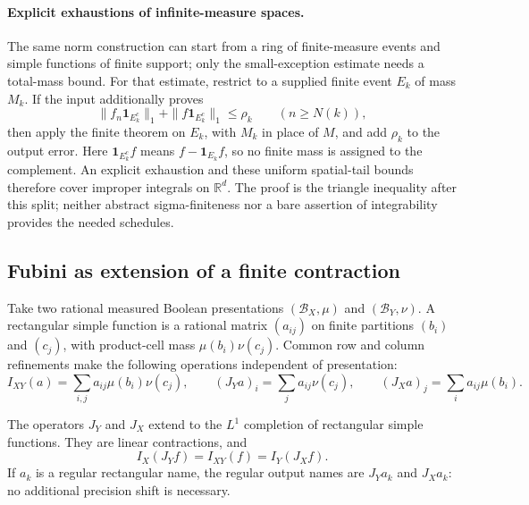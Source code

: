\paragraph{Explicit exhaustions of infinite-measure spaces.}
The same norm construction can start from a ring of finite-measure events
and simple functions of finite support; only the small-exception estimate
needs a total-mass bound.  For that estimate, restrict to a supplied finite
event \(E_k\) of mass \(M_k\).  If the input additionally proves
\[
 \|f_n\mathbf1_{E_k^c}\|_1+
 \|f\mathbf1_{E_k^c}\|_1\leq\rho_k
 \qquad(n\geq N(k)),
\]
then apply the finite theorem on \(E_k\), with \(M_k\) in place of \(M\),
and add \(\rho_k\) to the output error.  Here \(\mathbf1_{E_k^c}f\)
means \(f-\mathbf1_{E_k}f\), so no finite mass is assigned to the complement.
An explicit exhaustion and these uniform spatial-tail bounds therefore
cover improper integrals on \(\mathbb R^d\).  The proof is the triangle
inequality after this split; neither abstract sigma-finiteness nor a bare
assertion of integrability provides the needed schedules.

\subsection{Fubini as extension of a finite contraction}

Take two rational measured Boolean presentations \((\mathcal B_X,\mu)\)
and \((\mathcal B_Y,\nu)\).  A rectangular simple function is a rational
matrix \((a_{ij})\) on finite partitions \((b_i)\) and \((c_j)\), with
product-cell mass \(\mu(b_i)\nu(c_j)\).  Common row and column refinements
make the following operations independent of presentation:
\[
 I_{XY}(a)=\sum_{i,j}a_{ij}\mu(b_i)\nu(c_j),\qquad
 (J_Ya)_i=\sum_j a_{ij}\nu(c_j),\qquad
 (J_Xa)_j=\sum_i a_{ij}\mu(b_i).
\]

\begin{theorem}\label{thm:measure-fubini}
The operators \(J_Y\) and \(J_X\) extend to the \(L^1\) completion of
rectangular simple functions.  They are linear contractions, and
\[
 I_X(J_Yf)=I_{XY}(f)=I_Y(J_Xf).
\]
If \(a_k\) is a regular rectangular name, the regular output names are
\(J_Ya_k\) and \(J_Xa_k\): no additional precision shift is necessary.
\end{theorem}

